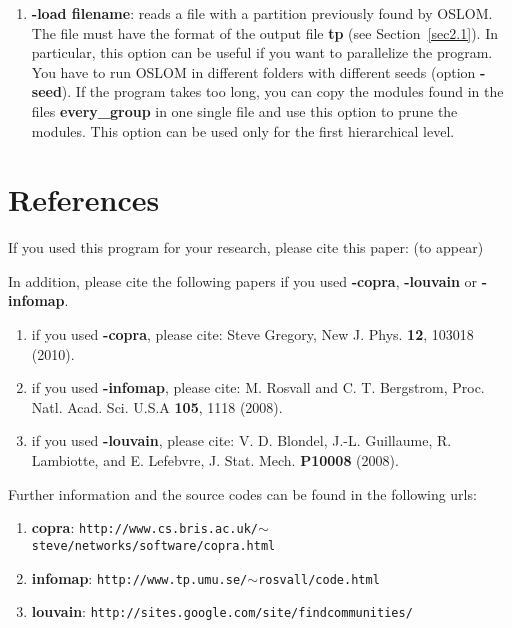 \documentclass[11pt]{article}
\begin{document}
\begin{enumerate}
    
  
  
  
\item \textbf{-load filename}: reads a file with a partition
previously found by OSLOM. The file must have the format of the output
file \textbf{tp} (see Section~\ref{sec2.1}). 
In particular, this option can be useful if you want to parallelize
the program. You have to run 
OSLOM in different folders with different seeds (option \textbf{-seed}).  
If the program takes too long, you can copy the modules found in the files
\textbf{every\_group} 
in one single file and use this option to prune the modules. This option can be used only for the first hierarchical level.
  
  
\end{enumerate}
  
  


\section{References}


If you used this program for your research, please cite this paper: (to appear)

\vskip0.3cm

\noindent In addition, please cite the following papers if you used  \textbf{-copra}, \textbf{-louvain} or \textbf{-infomap}.

\begin{enumerate}

  \item if you used \textbf{-copra}, please cite: Steve Gregory,
    New J. Phys. {\bf 12}, 103018 (2010).
  \item if you used \textbf{-infomap}, please cite: M. Rosvall and
    C. T. Bergstrom, Proc. Natl. Acad. Sci. U.S.A {\bf 105}, 1118 (2008).
\item if you used \textbf{-louvain}, please cite:   V. D. Blondel,
  J.-L. Guillaume, R. Lambiotte, and E. Lefebvre, J. Stat. Mech. {\bf
    P10008} (2008).
\end{enumerate}

Further information and the source codes can be found in the following urls:

\begin{enumerate}

  \item \textbf{copra}: {\tt http://www.cs.bris.ac.uk/$\sim$steve/networks/software/copra.html}
  \item \textbf{infomap}: {\tt http://www.tp.umu.se/$\sim$rosvall/code.html}
  \item \textbf{louvain}: {\tt http://sites.google.com/site/findcommunities/}
  \end{enumerate}
\end{document}

